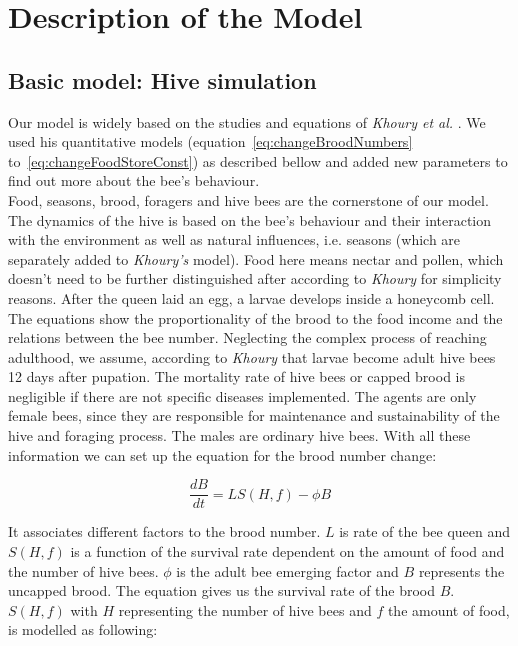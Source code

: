 \section{Description of the Model}
\subsection{Basic model: Hive simulation}
	\label{chap:basicModel}
	Our model is widely based on the studies and equations of \textit{Khoury et al.} \cite{khoury13}. We used his quantitative models (equation~\ref{eq:changeBroodNumbers} to~\ref{eq:changeFoodStoreConst}) as described bellow and added new parameters to find out more about the bee's behaviour.\\
	Food, seasons, brood, foragers and hive bees are the cornerstone of our model. The dynamics of the hive is based on the bee's behaviour and their interaction with the environment as well as natural influences, i.e. seasons (which are separately added to \textit{Khoury's} model). Food here means nectar and pollen, which doesn't need to be further distinguished after according to \textit{Khoury} for simplicity reasons. After the queen laid an egg, a larvae develops inside a honeycomb cell. The equations show the proportionality of the brood to the food income and the relations between the bee number. Neglecting the complex process of reaching adulthood, we assume, according to \textit{Khoury} that larvae become adult hive bees 12 days after pupation. The mortality rate of hive bees or capped brood is negligible if there are not specific diseases implemented. The agents are only female bees, since they are responsible for maintenance and sustainability of the hive and foraging process. The males are ordinary hive bees. With all these information we can set up the equation for the brood number change:
	
	\begin{equation}\label{eq:changeBroodNumbers}
		\frac{dB}{dt} = LS(H,f)-\phi B
	\end{equation}
	
	It associates different factors to the brood number. $L$ is rate of the bee queen and $S(H,f)$ is a function of the survival rate dependent on the amount of food and the number of hive bees. $\phi$ is the adult bee emerging factor and $B$ represents the uncapped brood. The equation gives us the survival rate of the brood $B$. $S(H,f)$ with $H$ representing the number of hive bees and $f$ the amount of food, is modelled as following:
	
